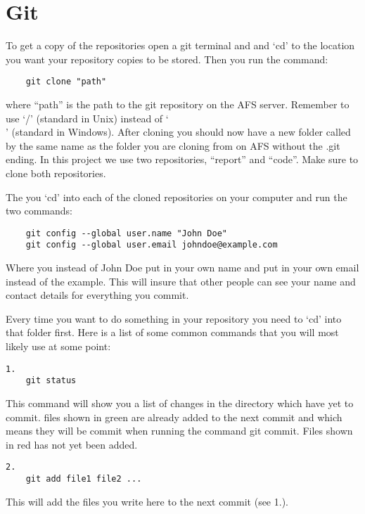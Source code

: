 \section{Git}

To get a copy of the repositories open a git terminal and and `cd' to the
location you want your repository copies to be stored. Then you run the 
command:

\begin{verbatim}
	git clone "path"
\end{verbatim}

where ``path'' is the path to the git repository on the AFS server. Remember to
use `/' (standard in Unix) instead of `\\' (standard in Windows). After cloning
you should now have a new folder called by the same name as the folder you are
cloning from on AFS without the .git ending.\n
In this project we use two repositories, ``report'' and ``code''.\n
Make sure to clone both repositories.

The you `cd' into each of the cloned repositories on your computer and run the 
two commands:

\begin{verbatim}
	git config --global user.name "John Doe"
	git config --global user.email johndoe@example.com
\end{verbatim}

Where you instead of John Doe put in your own name and put in your own email 
instead of the example.\n
This will insure that other people can see your name and contact details for 
everything you commit.

Every time you want to do something in your repository you need to `cd' into 
that folder first.\n
Here is a list of some common commands that you will most likely use at some 
point:


\begin{verbatim}
1.
	git status
\end{verbatim}

This command will show you a list of changes in the directory which have yet 
to commit. files shown in green are already added to the next commit and which 
means they will be commit when running the command git commit.\n
Files shown in red has not yet been added.

\begin{verbatim}
2.
	git add file1 file2 ...
\end{verbatim}

This will add the files you write here to the next commit (see 1.).


